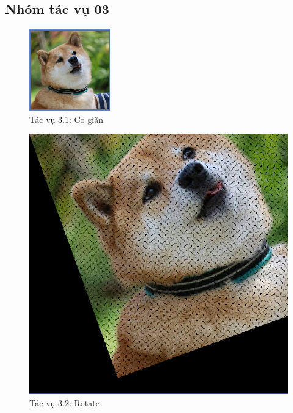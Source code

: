 \documentclass{article}
\begin{document}
	\subsection{Nhóm tác vụ 03}
	\begin{figure}[H]
		\centering
		\includegraphics[scale = 0.4]{31zoom}
		\caption{Tác vụ 3.1: Co giãn}
	\end{figure}
	\begin{figure}[H]
		\centering
		\includegraphics[scale = 0.4]{32rotation}
		\caption{Tác vụ 3.2: Rotate}
	\end{figure}
\end{document}
